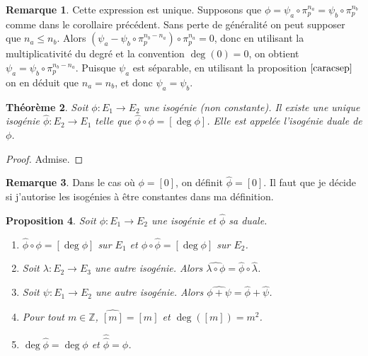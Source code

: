 \documentclass{article}
\theoremstyle{plain}%
\newtheorem{thm}{Théorème}[section]
\newtheorem{prop}[thm]{Proposition}
\theoremstyle{definition}%
\newtheorem{rem}[thm]{Remarque}
\newcommand{\Z}{\mathbb{Z}}
\newcommand{\h}{\widehat}
\begin{document}
\begin{rem}
  Cette expression est unique. Supposons que $\phi = \psi_a \circ \pi_p^{n_a} = \psi_b \circ \pi_p^{n_b}$ comme dans le corollaire précédent. Sans perte de généralité on peut supposer que $n_a \le n_b$. Alors $(\psi_a - \psi_b \circ \pi_p^{n_b - n_a}) \circ \pi_p^{n_a} = 0$, donc en utilisant la multiplicativité du degré et la convention $\deg(0) = 0$, on obtient $\psi_a = \psi_b \circ \pi_p^{n_b - n_a}$. Puisque $\psi_a$ est séparable, en utilisant la proposition $\ref{caracsep}$ on en déduit que $n_a = n_b$, et donc $\psi_a = \psi_b$.
\end{rem}

\begin{thm}
  \label{existence_duale}
  Soit $\phi : E_1\to E_2$ une isogénie (non constante). Il existe une unique isogénie $\h\phi : E_2\to E_1$ telle que $\h\phi \circ \phi = [\deg\phi]$. Elle est appelée l'isogénie duale de $\phi$.
\end{thm}

\begin{proof}
  Admise. 
\end{proof}

\begin{rem}
  Dans le cas où $\phi = [0]$, on définit $\h\phi = [0]$. {\color{red} Il faut que je décide si j'autorise les isogénies à être constantes dans ma définition}.
\end{rem}

\begin{prop}
  Soit $\phi : E_1 \to E_2$ une isogénie et $\h\phi$ sa duale.  
  \begin{enumerate}
    \item $\h\phi\circ\phi = [\deg{\phi}]$ sur $E_1$ et $\phi\circ\h\phi = [\deg{\phi}]$ sur $E_2$.
    \item Soit $\lambda :E_2\to E_3$ une autre isogénie. Alors $\h{\lambda\circ\phi} = \h\phi\circ\h\lambda$.
    \item Soit $\psi :E_1\to E_2$ une autre isogénie. Alors $\h{\phi+\psi} = \h\phi + \h\psi$.
    \item Pour tout $m\in\Z$, $\h{[m]} = [m]$ et $\deg([m]) = m^2$.
    \item $\deg\h\phi = \deg\phi$ et $\h{\h\phi} = \phi$.
  \end{enumerate}
\end{prop}
\end{document}
